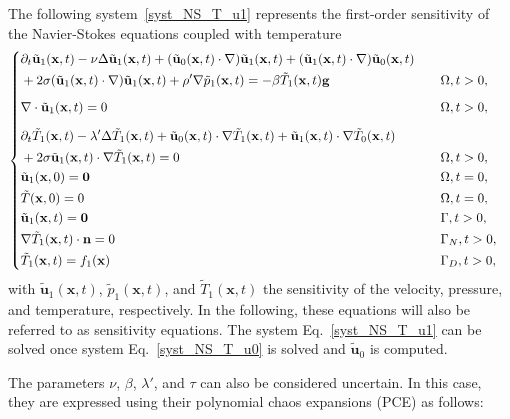 The following system~\eqref{syst_NS_T_u1} represents the first-order sensitivity of the Navier-Stokes equations coupled with temperature
\begin{equation} 
\left\lbrace
\begin{aligned}
& \partial_t \tilde{\mathbf{u}}_1(\mathbf{x},t)-\nu\Delta \tilde{\mathbf{u}}_1(\mathbf{x},t)+(\tilde{\mathbf{u}}_0(\mathbf{x},t)\cdot \nabla)\tilde{\mathbf{u}}_1(\mathbf{x},t)+(\tilde{\mathbf{u}}_1(\mathbf{x},t) \cdot \nabla)\tilde{\mathbf{u}}_0(\mathbf{x},t)\\ &  +2\sigma(\tilde{\mathbf{u}}_1(\mathbf{x},t)\cdot\nabla)\tilde{\mathbf{u}}_1(\mathbf{x},t)+\rho'\nabla \tilde p_1(\mathbf{x},t)=-\beta\tilde T_1(\mathbf{x},t)\mathbf g && \quad \Omega,t>0,\\[0.2cm]
& \nabla\cdot \tilde{\mathbf{u}}_1(\mathbf{x},t)=0 && \quad \Omega,t>0,\\[0.2cm]
 &\partial_t\tilde T_1(\mathbf{x},t)-\lambda'\Delta \tilde T_1(\mathbf{x},t) +\tilde{\mathbf{u}}_0(\mathbf{x},t)\cdot \nabla\tilde T_1(\mathbf{x},t)+\tilde{\mathbf{u}}_1(\mathbf{x},t)\cdot \nabla\tilde T_0(\mathbf{x},t)\\ &  +2\sigma\tilde{\mathbf{u}}_1(\mathbf{x},t)\cdot \nabla\tilde T_1(\mathbf{x},t)= 0 && \quad \Omega,t>0,\\
  & {\tilde{\mathbf{u}}}_1(\mathbf{x}, 0)= \mathbf{0} && \quad \Omega,t=0,\\
   & \tilde T(\mathbf{x}, 0)= 0 && \quad \Omega,t=0,\\
 & {\tilde{\mathbf{u}}}_1(\mathbf{x},t)=\mathbf{0} && \quad \Gamma,t>0,\\
 & \nabla \tilde{T}_1(\mathbf{x},t)\cdot \mathbf{n}=0 && \quad \Gamma_N,t>0,\\
 &\tilde{T}_1(\mathbf{x},t)=\textcolor{black}{ f_1(\mathbf{x})} && \quad \Gamma_D,t>0,
\end{aligned}
\right.
\label{syst_NS_T_u1}
\end{equation}
with  $\tilde{\mathbf{u}}_1(\mathbf{x},t)$, $\tilde p_1(\mathbf{x},t)$, and  $\tilde  T_1(\mathbf{x},t)$ the sensitivity of the velocity, pressure, and temperature, respectively. In the following, these equations will also be referred to as sensitivity equations. The system Eq.~\eqref{syst_NS_T_u1} can be solved once system Eq.~\eqref{syst_NS_T_u0} is solved and $\tilde{\mathbf{u}}_0$ is computed.


The parameters $ \nu$, $\beta$, $\lambda'$, and $\tau$  can also be considered uncertain. In this case, they are expressed using their polynomial chaos expansions (PCE) as follows:

